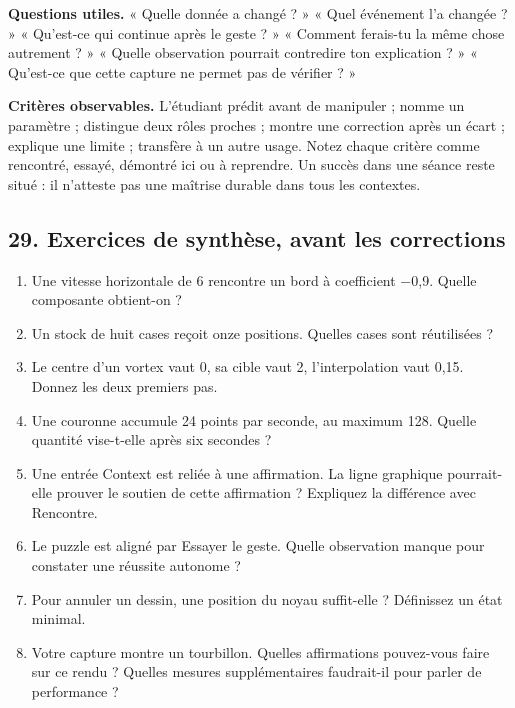 \documentclass[
  canadien,
  11pt,
  letterpaper,
]{article}
\providecommand{\tightlist}{%
  \setlength{\itemsep}{0pt}\setlength{\parskip}{0pt}}
\begin{document}
\textbf{Questions utiles.} « Quelle donnée a changé ? » « Quel événement
l'a changée ? » « Qu'est-ce qui continue après le geste ? » « Comment
ferais-tu la même chose autrement ? » « Quelle observation pourrait
contredire ton explication ? » « Qu'est-ce que cette capture ne permet
pas de vérifier ? »

\textbf{Critères observables.} L'étudiant prédit avant de manipuler ;
nomme un paramètre ; distingue deux rôles proches ; montre une
correction après un écart ; explique une limite ; transfère à un autre
usage. Notez chaque critère comme rencontré, essayé, démontré ici ou à
reprendre. Un succès dans une séance reste situé : il n'atteste pas une
maîtrise durable dans tous les contextes.

\subsection{29. Exercices de synthèse, avant les
corrections}\label{exercices-de-synthuxe8se-avant-les-corrections}

\begin{enumerate}
\def\labelenumi{\arabic{enumi}.}
\tightlist
\item
  Une vitesse horizontale de 6 rencontre un bord à coefficient −0,9.
  Quelle composante obtient-on ?
\item
  Un stock de huit cases reçoit onze positions. Quelles cases sont
  réutilisées ?
\item
  Le centre d'un vortex vaut 0, sa cible vaut 2, l'interpolation vaut
  0,15. Donnez les deux premiers pas.
\item
  Une couronne accumule 24 points par seconde, au maximum 128. Quelle
  quantité vise-t-elle après six secondes ?
\item
  Une entrée Context est reliée à une affirmation. La ligne graphique
  pourrait-elle prouver le soutien de cette affirmation ? Expliquez la
  différence avec Rencontre.
\item
  Le puzzle est aligné par Essayer le geste. Quelle observation manque
  pour constater une réussite autonome ?
\item
  Pour annuler un dessin, une position du noyau suffit-elle ? Définissez
  un état minimal.
\item
  Votre capture montre un tourbillon. Quelles affirmations pouvez-vous
  faire sur ce rendu ? Quelles mesures supplémentaires faudrait-il pour
  parler de performance ?
\end{enumerate}
\end{document}
